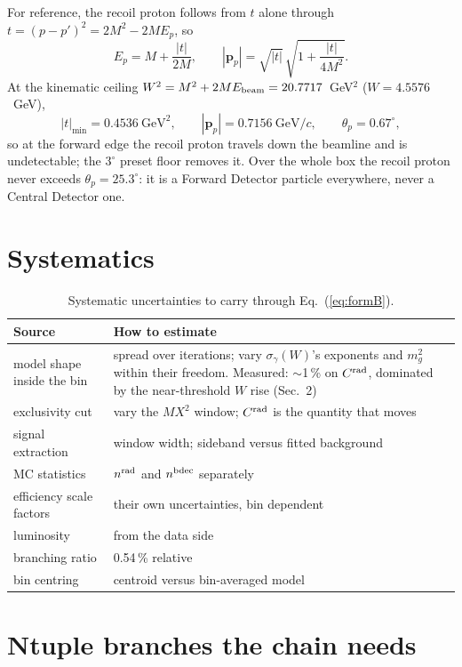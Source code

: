\documentclass[11pt]{article}
\newcommand{\crad}{C^{\rm rad}}
\begin{document}
For reference, the recoil proton follows from $t$ alone through $t=(p-p')^2=2M^2-2ME_p$, so
\begin{equation}
E_p=M+\frac{|t|}{2M},
\qquad
|\mathbf{p}_p|=\sqrt{|t|}\,\sqrt{1+\frac{|t|}{4M^2}} .
\label{eq:pproton}
\end{equation}
At the kinematic ceiling $W^2=M^2+2ME_{\rm beam}=20.7717$~GeV$^2$ ($W=4.5576$~GeV),
\begin{equation}
|t|_{\min}=0.4536~\mathrm{GeV}^2,
\qquad
|\mathbf{p}_p|=0.7156~\mathrm{GeV}/c,
\qquad
\theta_p=0.67^\circ ,
\end{equation}
so at the forward edge the recoil proton travels down the beamline and is undetectable; the
$3^\circ$ preset floor removes it. Over the whole box the recoil proton never exceeds
$\theta_p=25.3^\circ$: it is a Forward Detector particle everywhere, never a Central Detector one.

\section{Systematics}

\begin{table}[H]
\centering\small
\begin{tabular}{lp{9.5cm}}
\toprule
Source & How to estimate \\
\midrule
model shape inside the bin & spread over iterations; vary $\sigma_\gamma(W)$'s exponents and $m_g^2$ within their freedom. Measured: $\sim$1\,\% on $\crad$, dominated by the near-threshold $W$ rise (Sec.~2) \\
exclusivity cut & vary the $MX^2$ window; $\crad$ is the quantity that moves \\
signal extraction & window width; sideband versus fitted background \\
MC statistics & $n^{\rm rad}$ and $n^{\rm bdec}$ separately \\
efficiency scale factors & their own uncertainties, bin dependent \\
luminosity & from the data side \\
branching ratio & 0.54\,\% relative \\
bin centring & centroid versus bin-averaged model \\
\bottomrule
\end{tabular}
\caption{Systematic uncertainties to carry through Eq.~(\ref{eq:formB}).}
\end{table}

\section{Ntuple branches the chain needs}
\end{document}
